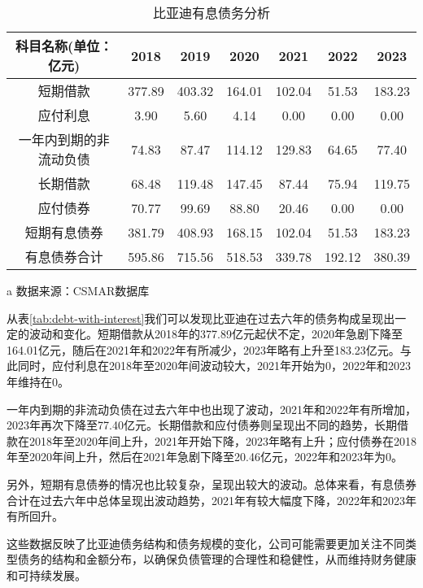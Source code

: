 \begin{table}
  \centering
  \begin{threeparttable}[c]
    \caption{比亚迪有息债务分析}
    \label{tab:debt-with-interest}
    \begin{tabular}{ccccccc}
      \toprule
        科目名称(单位：亿元) & 2018 & 2019 & 2020 & 2021 & 2022 & 2023 \\ 
      \midrule
        短期借款 & 377.89  & 403.32  & 164.01  & 102.04  & 51.53  & 183.23  \\ 
        应付利息 & 3.90  & 5.60  & 4.14  & 0.00  & 0.00  & 0.00  \\ 
        一年内到期的非流动负债 & 74.83  & 87.47  & 114.12  & 129.83  & 64.65  & 77.40  \\ 
        长期借款 & 68.48  & 119.48  & 147.45  & 87.44  & 75.94  & 119.75  \\ 
        应付债券 & 70.77  & 99.69  & 88.80  & 20.46  & 0.00  & 0.00  \\ 
        短期有息债券 & 381.79  & 408.93  & 168.15  & 102.04  & 51.53  & 183.23  \\ 
        有息债券合计 & 595.86  & 715.56  & 518.53  & 339.78  & 192.12  & 380.39 \\ 
      \bottomrule
    \end{tabular}
    \begin{tablenotes}
      \item [a] 数据来源：CSMAR数据库
    \end{tablenotes}
  \end{threeparttable}
\end{table}
从表\eqref{tab:debt-with-interest}我们可以发现比亚迪在过去六年的债务构成呈现出一定的波动和变化。短期借款从2018年的377.89亿元起伏不定，2020年急剧下降至164.01亿元，随后在2021年和2022年有所减少，2023年略有上升至183.23亿元。与此同时，应付利息在2018年至2020年间波动较大，2021年开始为0，2022年和2023年维持在0。

一年内到期的非流动负债在过去六年中也出现了波动，2021年和2022年有所增加，2023年再次下降至77.40亿元。长期借款和应付债券则呈现出不同的趋势，长期借款在2018年至2020年间上升，2021年开始下降，2023年略有上升；应付债券在2018年至2020年间上升，然后在2021年急剧下降至20.46亿元，2022年和2023年为0。

另外，短期有息债券的情况也比较复杂，呈现出较大的波动。总体来看，有息债券合计在过去六年中总体呈现出波动趋势，2021年有较大幅度下降，2022年和2023年有所回升。

这些数据反映了比亚迪债务结构和债务规模的变化，公司可能需要更加关注不同类型债务的结构和金额分布，以确保负债管理的合理性和稳健性，从而维持财务健康和可持续发展。
